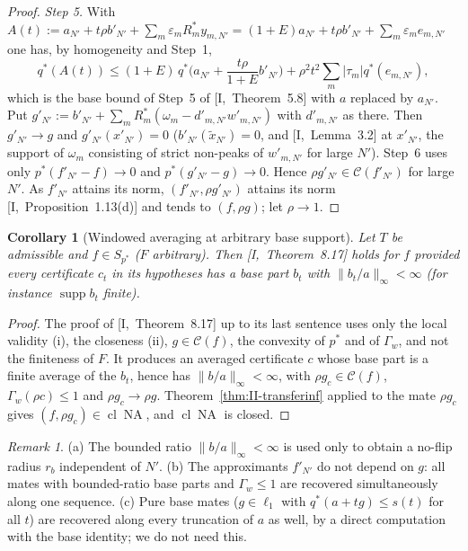 \documentclass[10pt]{amsart}
\newtheorem{corollary}[theorem]{Corollary}
\theoremstyle{definition}
\theoremstyle{remark}
\newtheorem{remark}[theorem]{Remark}
\newcommand{\NA}{\operatorname{NA}}
\newcommand{\supp}{\operatorname{supp}}
\newcommand{\Cset}{\mathcal C}
\newcommand{\cl}{\operatorname{cl}}
\begin{document}
\begin{proof}
\emph{Step 5.}  With $A(t):=a_{N'}+t\rho b'_{N'}+\sum_m\varepsilon_m
R_m^*y_{m,N'}=(1+E)a_{N'}+t\rho b'_{N'}+\sum_m\varepsilon_me_{m,N'}$ one has,
by homogeneity and Step~1,
\[
 q^*(A(t))\le(1+E)\,q^*\Big(a_{N'}+\frac{t\rho}{1+E}b'_{N'}\Big)+\rho^2t^2
 \sum_m|\tau_m|q^*(e_{m,N'}),
\]
which is the base bound of Step~5 of [I,~Theorem~5.8] with $a$ replaced by
$a_{N'}$.  Put $g'_{N'}:=b'_{N'}+\sum_mR_m^*(\omega_m-d'_{m,N'}w'_{m,N'})$
with $d'_{m,N'}$ as there.  Then $g'_{N'}\to g$ and $g'_{N'}(x'_{N'})=0$
($b'_{N'}(\tilde x_{N'})=0$, and [I,~Lemma~3.2] at $x'_{N'}$, the support of
$\omega_m$ consisting of strict non-peaks of $w'_{m,N'}$ for large $N'$).
Step~6 uses only $p^*(f'_{N'}-f)\to0$ and $p^*(g'_{N'}-g)\to0$.  Hence
$\rho g'_{N'}\in\Cset(f'_{N'})$ for large $N'$.  As $f'_{N'}$ attains its
norm, $(f'_{N'},\rho g'_{N'})$ attains its norm [I,~Proposition~1.13(d)]
and tends to $(f,\rho g)$; let $\rho\to1$.
\end{proof}

\begin{corollary}[Windowed averaging at arbitrary base support]
\label{cor:II-windowedinf}
Let $T$ be admissible and $f\in S_{p^*}$ \textup{(}$F$ arbitrary\textup{)}.
Then [I,~Theorem~8.17] holds for $f$ provided every certificate $c_t$ in its
hypotheses has a base part $b_t$ with $\|b_t/a\|_\infty<\infty$ \textup{(}for
instance $\supp b_t$ finite\textup{)}.
\end{corollary}

\begin{proof}
The proof of [I,~Theorem~8.17] up to its last sentence uses only the local
validity (i), the closeness (ii), $g\in\Cset(f)$, the convexity of $p^*$ and
of $\Gamma_w$, and not the finiteness of $F$.  It produces an averaged
certificate $c$ whose base part is a finite average of the $b_t$, hence has
$\|b/a\|_\infty<\infty$, with $\rho g_c\in\Cset(f)$, $\Gamma_w(\rho c)\le1$
and $\rho g_c\to\rho g$.  Theorem~\ref{thm:II-transferinf} applied to the
mate $\rho g_c$ gives $(f,\rho g_c)\in\cl\NA$, and $\cl\NA$ is closed.
\end{proof}

\begin{remark}\label{rem:II-transferinf}
(a) The bounded ratio $\|b/a\|_\infty<\infty$ is used only to obtain a
no-flip radius $r_b$ independent of $N'$.  (b) The approximants
$f'_{N'}$ do not depend on $g$: all mates with bounded-ratio base parts and
$\Gamma_w\le1$ are recovered simultaneously along one sequence.  (c) Pure
base mates ($g\in\ell_1$ with $q^*(a+tg)\le s(t)$ for all $t$) are
recovered along every truncation of $a$ as well, by a direct computation
with the base identity; we do not need this.
\end{remark}
\end{document}
